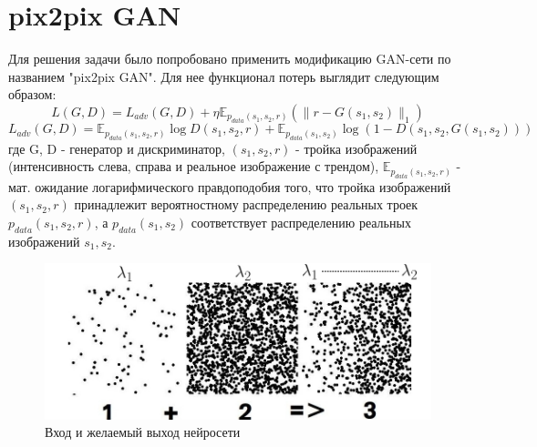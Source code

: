 \documentclass[a4paper]{article}
\begin{document}
	\section{pix2pix GAN}
		Для решения задачи было попробовано применить модификацию GAN-сети по названием "pix2pix GAN". Для нее функционал потерь выглядит следующим образом: $$ L(G, D) = L_{adv}(G, D) + \eta \mathbb{E}_{p_{data}(s_1, s_2, r)} (\parallel r - G(s_1, s_2) \parallel_1)$$
		$$ L_{adv}(G, D) = \mathbb{E}_{p_{data}(s_1, s_2, r)}\log D(s_1, s_2, r) +  \mathbb{E}_{p_{data}(s_1, s_2)} \log (1 - D(s_1, s_2, G(s_1, s_2)))$$
		где G, D - генератор и дискриминатор, $(s_1, s_2, r)$ - тройка изображений (интенсивность слева, справа и реальное изображение с трендом),  $\mathbb{E}_{p_{data}(s_1, s_2, r)}$ - мат. ожидание логарифмического правдоподобия того, что тройка изображений $(s_1, s_2, r)$ принадлежит вероятностному распределению реальных троек $p_{data}(s_1, s_2, r)$, а $p_{data}(s_1, s_2)$ соответствует распределению реальных изображений $s_1, s_2$.
		\begin{figure}[h]
			\begin{center}
				\includegraphics[width=0.75\linewidth]{p2p-gen}
			\end{center}
			\caption{Вход и желаемый выход нейросети}
		\end{figure}
\end{document}
